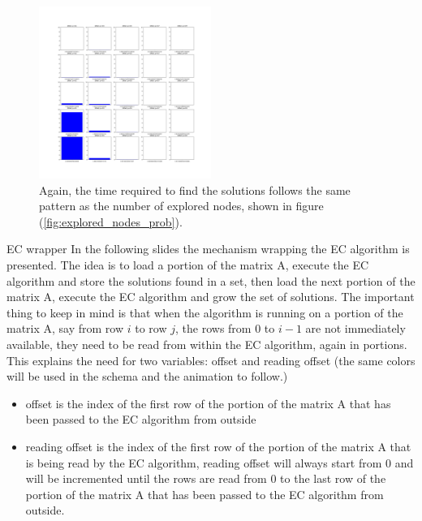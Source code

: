 \documentclass{beamer}
\begin{document}
\begin{frame}{}
    \begin{figure}
        \centering
        \includegraphics[width=0.5\textwidth]{time_to_solve_prob.pdf}
        \caption{Again, the time required to find the solutions follows the same pattern as 
        the number of explored nodes, shown in figure (\ref{fig:explored_nodes_prob}).}
        \label{fig:time_to_solve_prob}
    \end{figure}
\end{frame}

\begin{frame}{EC wrapper}
    In the following slides the mechanism wrapping the EC algorithm
    is presented. 
    The idea is to load a portion of the matrix A, execute the EC algorithm
    and store the solutions found in a set, then load the next portion of
    the matrix A, execute the EC algorithm and grow the set of solutions.
    The important thing to keep in mind is that when the algorithm 
    is running on a portion of the matrix A, say from row $i$ to row $j$,
    the rows from $0$ to $i-1$ are not immediately available, they need to
    be read from within the EC algorithm, again in portions.
    This explains the need for two variables:
    \textcolor{offset}{offset} and \textcolor{reading_offset}{reading offset}
    (the same colors will be used in the schema and the animation to follow.)
\end{frame}

\begin{frame}{}
    \begin{itemize}
        \item \textcolor{offset}{offset} is the index of the first row of the portion
            of the matrix A that has been passed to the EC algorithm from outside
        \item \textcolor{reading_offset}{reading offset} is the index of the first row of the portion
            of the matrix A that is being read by the EC algorithm,
            reading offset will always start from 0 and will be incremented until
            the rows are read from 0 to the last row of the portion of the matrix A 
            that has been passed to the EC algorithm from outside.
    \end{itemize}
\end{frame}
\end{document}
